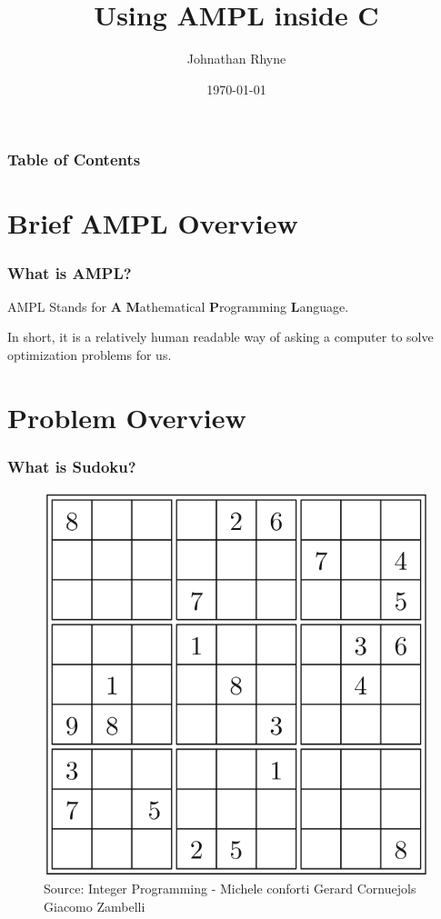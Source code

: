\documentclass{beamer}
\title{Using AMPL inside C}
\author{Johnathan Rhyne}
\institute{CU Denver}
\date{\today}
\begin{document}
    \frame{\titlepage}
    \begin{frame}
        \frametitle{Table of Contents}
        \tableofcontents
    \end{frame}
    \section{Brief AMPL Overview}
    \begin{frame}
        \frametitle{What is AMPL?}
        AMPL Stands for \textbf{A} \textbf{M}athematical \textbf{P}rogramming \textbf{L}anguage.

        In short, it is a relatively
        human readable way of asking a computer to solve optimization problems for us.
    \end{frame}
    \section{Problem Overview}
    \begin{frame}
        \frametitle{What is Sudoku?}
        \begin{figure}
            \includegraphics[scale=0.25]{figures/sudokuGrid.png}
            \caption{Source: Integer Programming - Michele conforti Gerard Cornuejols Giacomo Zambelli}
        \end{figure}
    \end{frame}
\end{document}
